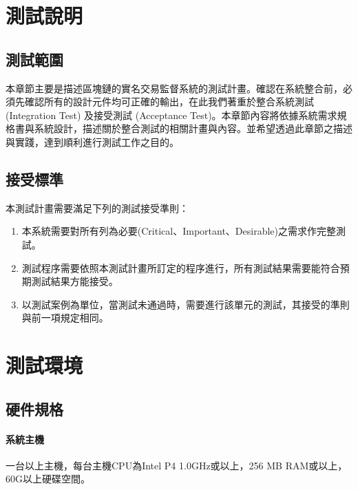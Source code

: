  	\section{測試說明}

 		\subsection{測試範圍}本章節主要是描述區塊鏈的實名交易監督系統的測試計畫。確認在系統整合前，必須先確認所有的設計元件均可正確的輸出，在此我們著重於整合系統測試 (Integration Test) 及接受測試 (Acceptance Test)。本章節內容將依據系統需求規格書與系統設計，描述關於整合測試的相關計畫與內容。並希望透過此章節之描述與實踐，達到順利進行測試工作之目的。

 		\subsection{接受標準}本測試計畫需要滿足下列的測試接受準則： 

 			\begin{enumerate}
				\item 本系統需要對所有列為必要(Critical、Important、Desirable)之需求作完整測試。
				\item 測試程序需要依照本測試計畫所訂定的程序進行，所有測試結果需要能符合預期測試結果方能接受。
				\item 以測試案例為單位，當測試未通過時，需要進行該單元的測試，其接受的準則與前一項規定相同。 
			\end{enumerate}
 	
 	\section{測試環境}

 		\subsection{硬件規格}
 			
 			\paragraph{系統主機}一台以上主機，每台主機CPU為Intel P4 1.0GHz或以上，256 MB RAM或以上，60G以上硬碟空間。
